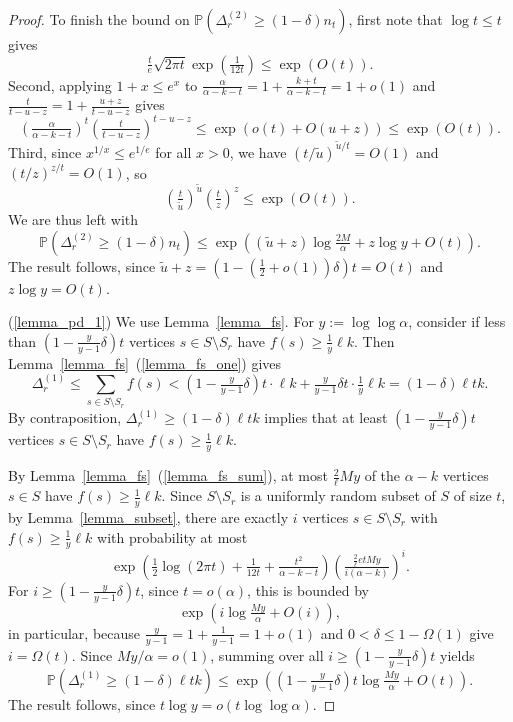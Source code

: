 \documentclass{article}
\theoremstyle{plain}
\theoremstyle{remark}
\theoremstyle{plain}
\numberwithin{equation}{section}
\begin{document}
\begin{proof}
		To finish the bound on $\mathbb{P}(\Delta_r^{(2)}\geq(1-\delta)n_t)$, first note that $\log t\leq t$ gives $$\tfrac{t}{e}\sqrt{2\pi t}\exp(\tfrac1{12 t})\leq\exp(O(t)).$$ Second, applying $1+x\leq e^x$ to $\tfrac{\alpha}{\alpha-k-t}=1+\tfrac{k+t}{\alpha-k-t}=1+o(1)$ and $\tfrac{t}{t-u-z}=1+\tfrac{u+z}{t-u-z}$ gives $$(\tfrac{\alpha}{\alpha-k-t})^t(\tfrac{t}{t-u-z})^{t-u-z}\leq\exp(o(t)+O(u+z))\leq\exp(O(t)).$$ Third, since $x^{1/x}\leq e^{1/e}$ for all $x>0$, we have $(t/\widetilde{u})^{\tilde{u}/t}=O(1)$ and $(t/z)^{z/t}=O(1)$, so $$(\tfrac{t}{\tilde{u}})^{\tilde{u}}(\tfrac{t}{z})^z\leq\exp(O(t)).$$ We are thus left with $$\mathbb{P}(\Delta_r^{(2)}\geq(1-\delta)n_t)\leq\exp\left((\widetilde{u}+z)\log\tfrac{2M}{\alpha}+z\log y+O(t)\right).$$ The result follows, since $\widetilde{u}+z=(1-(\tfrac12+o(1))\delta)t=O(t)$ and $z\log y=O(t)$.
		
		(\ref{lemma_pd_1}) We use Lemma~\ref{lemma_fs}. For $y:=\log\log\alpha$, consider if less than $(1-\tfrac{y}{y-1}\delta)t$ vertices $s\in S\setminus S_r$ have $f(s)\geq\tfrac1y\ell k$. Then Lemma~\ref{lemma_fs}~(\ref{lemma_fs_one}) gives $$\Delta_r^{(1)}\leq\sum_{s\in S\setminus S_r}f(s)<(1-\tfrac{y}{y-1}\delta)t\cdot\ell k+\tfrac{y}{y-1}\delta t\cdot\tfrac1y\ell k=(1-\delta)\ell tk.$$ By contraposition, $\Delta_r^{(1)}\geq(1-\delta)\ell tk$ implies that at least $(1-\tfrac{y}{y-1}\delta)t$ vertices $s\in S\setminus S_r$ have $f(s)\geq\tfrac1y\ell k$.
		
		By Lemma~\ref{lemma_fs}~(\ref{lemma_fs_sum}), at most $\tfrac{2}{\ell}My$ of the $\alpha-k$ vertices $s\in S$ have $f(s)\geq\tfrac1y\ell k$. Since $S\setminus S_r$ is a uniformly random subset of $S$ of size $t$, by Lemma~\ref{lemma_subset}, there are exactly $i$ vertices $s\in S\setminus S_r$ with $f(s)\geq\tfrac1y\ell k$ with probability at most $$\exp\left(\tfrac12\log(2\pi t)+\tfrac1{12t}+\tfrac{t^2}{\alpha-k-t}\right)\left(\tfrac{\frac{2}{\ell}etMy}{i(\alpha-k)}\right)^i.$$ For $i\geq(1-\tfrac{y}{y-1}\delta)t$, since $t=o(\alpha)$, this is bounded by $$\exp\left(i\log\tfrac{My}{\alpha}+O(i)\right),$$ in particular, because $\tfrac{y}{y-1}=1+\tfrac1{y-1}=1+o(1)$ and $0<\delta\leq1-\Omega(1)$ give $i=\Omega(t)$. Since $My/\alpha=o(1)$, summing over all $i\geq(1-\tfrac{y}{y-1}\delta)t$ yields $$\mathbb{P}(\Delta_r^{(1)}\geq(1-\delta)\ell tk)\leq\exp\left(\left(1-\tfrac{y}{y-1}\delta\right)t\log\tfrac{My}{\alpha}+O(t)\right).$$ The result follows, since $t\log y=o(t\log\log\alpha)$.
	\end{proof}
	
\end{document}
